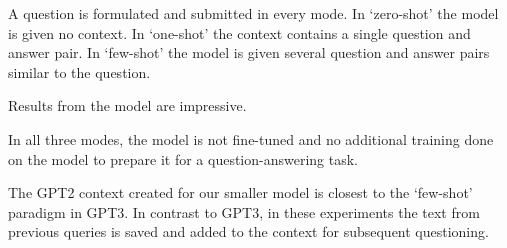 A question is formulated and submitted in every mode. In `zero-shot' the model is given no  context. In `one-shot' the context contains a single question and answer pair. In `few-shot' the model is given several question and answer pairs similar to the question.

Results from the model are impressive. 

In all three modes, the model is not fine-tuned and no additional training done on the model to prepare it for a question-answering task.

The GPT2 context created for our smaller model is closest to the `few-shot' paradigm in GPT3. In contrast to GPT3, in these experiments the text from previous queries is saved and added to the context for subsequent questioning.

